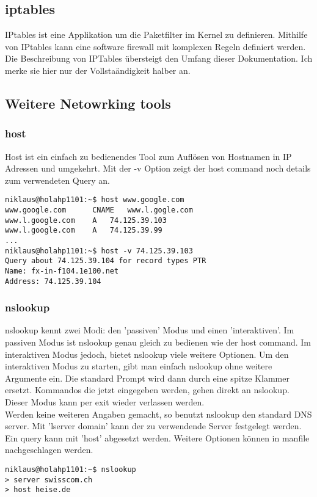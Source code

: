 \subsection{iptables}
IPtables ist eine Applikation um die Paketfilter im Kernel zu definieren. Mithilfe von IPtables kann eine software firewall mit komplexen Regeln definiert werden. Die Beschreibung von IPTables \"ubersteigt den Umfang dieser Dokumentation. Ich merke sie hier nur der Vollsta\"andigkeit halber an.
\subsection{Weitere Netowrking tools}
\subsubsection{host}
Host ist ein einfach zu bedienendes Tool zum Aufl\"osen von Hostnamen in IP Adressen und umgekehrt. Mit der -v Option zeigt der host command noch details zum verwendeten Query an.
\begin{lstlisting}[frame=single]
niklaus@holahp1101:~$ host www.google.com
www.google.com		CNAME	www.l.gogle.com
www.l.google.com	A	74.125.39.103
www.l.google.com	A	74.125.39.99
...
niklaus@holahp1101:~$ host -v 74.125.39.103
Query about 74.125.39.104 for record types PTR
Name: fx-in-f104.1e100.net
Address: 74.125.39.104
\end{lstlisting}
\subsubsection{nslookup}
nslookup kennt zwei Modi: den 'passiven' Modus und einen 'interaktiven'. Im passiven Modus ist nslookup genau gleich zu bedienen wie der host command. Im interaktiven Modus jedoch, bietet nslookup viele weitere Optionen. Um den interaktiven Modus zu starten, gibt man einfach nslookup ohne weitere Argumente ein. Die standard Prompt wird dann durch eine spitze Klammer ersetzt. Kommandos die jetzt eingegeben werden, gehen direkt an nslookup. Dieser Modus kann per exit wieder verlassen werden.\\
Werden keine weiteren Angaben gemacht, so benutzt nslookup den standard DNS server. Mit 'lserver domain' kann der zu verwendende Server festgelegt werden. Ein query kann mit 'host' abgesetzt werden. Weitere Optionen k\"onnen in manfile nachgeschlagen werden.
\begin{lstlisting}[frame=single]
niklaus@holahp1101:~$ nslookup
> server swisscom.ch
> host heise.de
\end{lstlisting}

